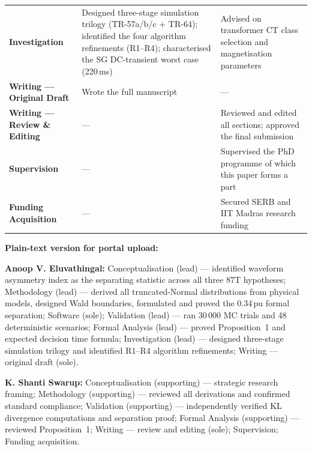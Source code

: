\documentclass[11pt,a4paper]{article}
\begin{document}
\begin{tabular}{@{} >{\bfseries}p{4.0cm} p{5.1cm} p{5.1cm} @{}}
Investigation &
Designed three-stage simulation trilogy (TR-57a/b/c + TR-64); identified
the four algorithm refinements (R1--R4); characterised the SG DC-transient
worst case (220\,ms) &
Advised on transformer CT class selection and magnetisation parameters \\[5pt]

Writing --- Original Draft &
Wrote the full manuscript &
--- \\[5pt]

Writing --- Review \& Editing &
--- &
Reviewed and edited all sections; approved the final submission \\[5pt]

Supervision &
--- &
Supervised the PhD programme of which this paper forms a part \\[5pt]

Funding Acquisition &
--- &
Secured SERB and IIT Madras research funding \\

\bottomrule
\end{tabular}

\bigskip\bigskip

\noindent\textbf{Plain-text version for portal upload:}

\medskip

\noindent
\textbf{Anoop V. Eluvathingal:} Conceptualisation (lead) --- identified
waveform asymmetry index as the separating statistic across all three
87T hypotheses; Methodology (lead) --- derived all truncated-Normal
distributions from physical models, designed Wald boundaries, formulated
and proved the 0.34\,pu formal separation; Software (sole); Validation
(lead) --- ran 30\,000 MC trials and 48 deterministic scenarios; Formal
Analysis (lead) --- proved Proposition~1 and expected decision time
formula; Investigation (lead) --- designed three-stage simulation trilogy
and identified R1--R4 algorithm refinements; Writing --- original draft
(sole).

\medskip\noindent
\textbf{K. Shanti Swarup:} Conceptualisation (supporting) --- strategic
research framing; Methodology (supporting) --- reviewed all derivations
and confirmed standard compliance; Validation (supporting) ---
independently verified KL divergence computations and separation proof;
Formal Analysis (supporting) --- reviewed Proposition~1; Writing ---
review and editing (sole); Supervision; Funding acquisition.
\end{document}

